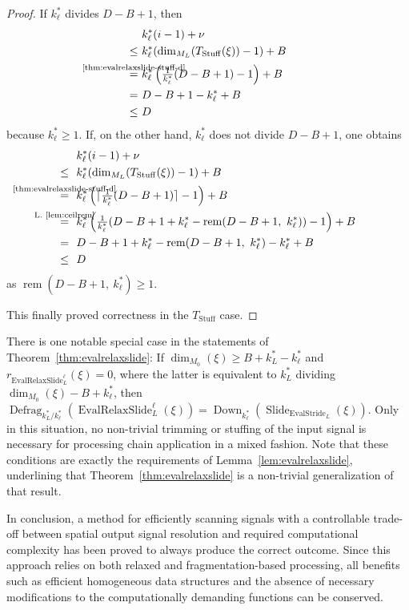 \documentclass[journal]{IEEEtran}
\newcommand{\ROI}{B}
\newcommand{\nceil}[1]{\lceil #1 \rceil}
\DeclareMathOperator{\Slide}{Slide}
\DeclareMathOperator{\Defragmentation}{Defrag}
\DeclareMathOperator{\EvalStride}{EvalStride}
\DeclareMathOperator{\Stuffing}{Stuff}
\newcommand{\rem}[2]{\operatorname{rem}(#1,\ #2)}
\newcommand{\equsing}[1]{\overset{\mathclap{\text{#1}}}{=}}
\DeclareMathOperator{\EvalRelaxSlide}{EvalRelaxSlide}
\DeclareMathOperator{\Downsampling}{Down}
\begin{document}
\begin{proof}
If $k_\ell^*$ divides $D - \ROI + 1$, then
\begin{align*}
  & k_\ell^*(i - 1) + \nu\\
  \leq\ & k_\ell^*(\dim_{M_L}( T_{\Stuffing}(\xi) ) - 1) + \ROI\\
  \equsing{\ref{thm:evalrelaxslide-stuff-d}}\ & k_\ell^*\left(\tfrac{1}{k_\ell^*}(D - \ROI + 1) - 1\right) + \ROI\\
  =\ & D - \ROI + 1 - k_\ell^* + \ROI\\
  \leq\ & D
\end{align*}
because $k_\ell^* \geq 1$.
If, on the other hand, $k_\ell^*$ does not divide $D - \ROI + 1$, one obtains
\begin{align*}
  & k_\ell^*(i - 1) + \nu\\
  \leq\ \ & k_\ell^*(\dim_{M_L}( T_{\Stuffing}(\xi) ) - 1) + \ROI\\
  \equsing{\ref{thm:evalrelaxslide-stuff-d}}\ \ & k_\ell^*\left(\nceil{\tfrac{1}{k_\ell^*}( D - \ROI + 1 )} - 1\right) + \ROI\\
  \equsing{L.~\ref{lem:ceilrem}}\ \ & k_\ell^*\left(\tfrac{1}{k_\ell^*}(D - \ROI + 1 + k_\ell^* - \rem{D - \ROI + 1}{k_\ell^*}) - 1\right) + \ROI\\
  =\ \ & D - \ROI + 1 + k_\ell^* - \rem{D - \ROI + 1}{k_\ell^*} - k_\ell^* + \ROI\\
  \leq\ \ & D
\end{align*}
as $\rem{D - \ROI + 1}{k_\ell^*} \geq 1$.

This finally proved correctness in the $T_{\Stuffing}$ case.
\end{proof}

There is one notable special case in the statements of Theorem~\ref{thm:evalrelaxslide}:
If $\dim_{M_0}(\xi) \geq \ROI + k_L^* - k_\ell^*$ and $r_{\EvalRelaxSlide_L^\ell}(\xi) = 0$, where the latter is equivalent to $k_L^*$ dividing $\dim_{M_0}(\xi) - \ROI + k_\ell^*$, then $\Defragmentation_{k_L^* / k_\ell^*}( \EvalRelaxSlide_L^\ell( \xi ) ) = \Downsampling_{k_\ell^*}( \Slide_{\EvalStride_L} ( \xi ) )$.
Only in this situation, no non-trivial trimming or stuffing of the input signal is necessary for processing chain application in a mixed fashion.
Note that these conditions are exactly the requirements of Lemma~\ref{lem:evalrelaxslide}, underlining that Theorem~\ref{thm:evalrelaxslide} is a non-trivial generalization of that result.

In conclusion, a method for efficiently scanning signals with a controllable trade-off between spatial output signal resolution and required computational complexity has been proved to always produce the correct outcome.
Since this approach relies on both relaxed and fragmentation-based processing, all benefits such as efficient homogeneous data structures and the absence of necessary modifications to the computationally demanding functions can be conserved.

\end{document}
